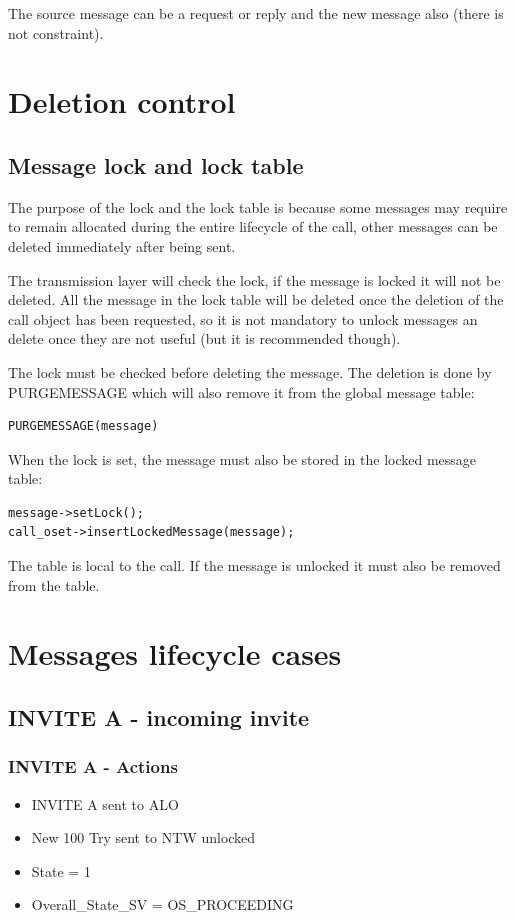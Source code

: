 \documentclass[a4paper]{report}
\begin{document}
The source message can be a request or reply and the new message also (there is not constraint).

\section{Deletion control}

\subsection{Message lock and lock table}

The purpose of the lock and the lock table is because some messages may require to remain allocated during the entire lifecycle of the call,
other messages can be deleted immediately after being sent.

The transmission layer will check the lock, if the message is locked it will not be deleted. 
All the message in the lock table will be deleted once the deletion of the call object has been requested, so it is not mandatory to unlock messages an delete once they are not useful
(but it is recommended though).

The lock must be checked before deleting the message. The deletion is done by PURGEMESSAGE which will also remove it from the global message table:
\begin{verbatim}
PURGEMESSAGE(message)
\end{verbatim}

When the lock is set, the message must also be stored in the locked message table:
\begin{verbatim}
message->setLock();
call_oset->insertLockedMessage(message);
\end{verbatim}
The table is local to the call. If the message is unlocked it must also be removed from the table.

\section{Messages lifecycle cases}

\subsection{INVITE A - incoming invite}

\subsubsection{INVITE A - Actions}
\begin {itemize}
\item INVITE A sent to ALO
\item New 100 Try sent to NTW unlocked
\item State = 1
\item Overall\_State\_SV = OS\_PROCEEDING
\end{itemize}
\end{document}
